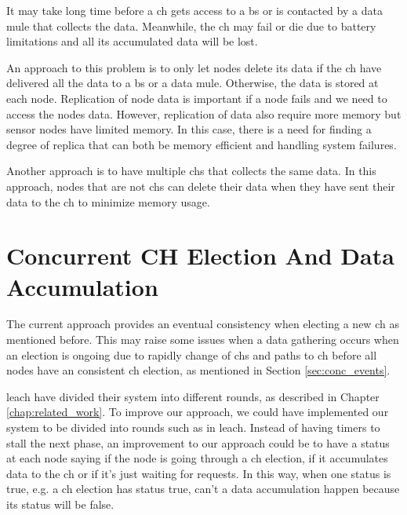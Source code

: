 \documentclass[USenglish]{uit-thesis}
\begin{document}
It may take long time before a \gls{ch} gets access to a \gls{bs} or is contacted by a data mule that collects the data. Meanwhile, the \gls{ch} may fail or die due to battery limitations and all its accumulated data will be lost.

An approach to this problem is to only let nodes delete its data if the \gls{ch} have delivered all the data to a \gls{bs} or a data mule. Otherwise, the data is stored at each node.
Replication of node data is important if a node fails and we need to access the nodes data. However, replication of data also require more memory but sensor nodes have limited memory. In this case, there is a need for finding a degree of replica that can both be memory efficient and handling system failures.

Another approach is to have multiple \glspl{ch} that collects the same data. In this approach, nodes that are not \glspl{ch} can delete their data when they have sent their data to the \gls{ch} to minimize memory usage.




\section{Concurrent CH Election And Data Accumulation} \label{disc:simult_el_acc}
The current approach provides an eventual consistency when electing a new \gls{ch} as mentioned before. This may raise some issues when a data gathering occurs when an election is ongoing due to rapidly change of \gls{ch}s and paths to \gls{ch} before all nodes have an consistent \gls{ch} election, as mentioned in Section \ref{sec:conc_events}.


\gls{leach} have divided their system into different rounds, as described in Chapter \ref{chap:related_work}. To improve our approach, we could have implemented our system to be divided into rounds such as in \gls{leach}. Instead of having timers to stall the next phase, an improvement to our approach could be to have a status at each node saying if the node is going through a \gls{ch} election, if it accumulates data to the \gls{ch} or if it's just waiting for requests. In this way, when one status is true, e.g. a \gls{ch} election has status true, can't a  data accumulation happen because its status will be false.
\end{document}
